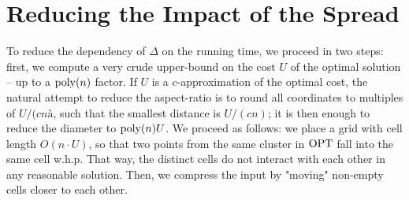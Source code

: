 %
%
%
%
%


\section{Reducing the Impact of the Spread}
To reduce the dependency of $\Delta$ on the running time, we proceed in two steps: first, we compute a very crude upper-bound on the cost $U$ of the optimal solution -- up to a $\operatorname{poly}(n)$ factor. 
If $U$ is a $c$-approximation of the optimal cost, the natural attempt to reduce the aspect-ratio is to round all coordinates to multiples of $U/(cnà$, such that the smallest distance is $U/(cn)$; it is then enough to reduce the diameter to $\operatorname{poly}(n) U$. We proceed as follows: we place a grid with cell length $O(n \cdot U)$, so that two points from the same cluster in $\text{OPT}$ fall into the same cell w.h.p. That way, the distinct cells do not interact with each other in any reasonable solution. 
Then, we compress the input by "moving" non-empty cells closer to each other.

